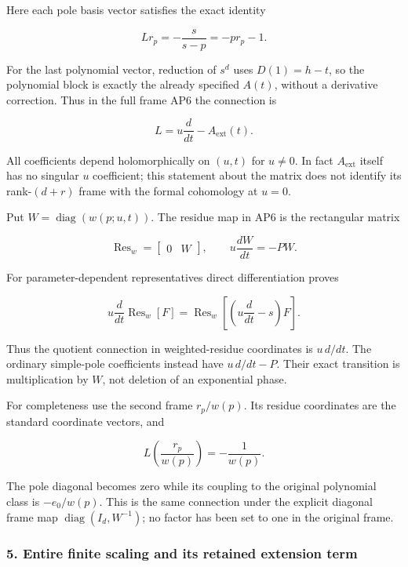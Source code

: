Here each pole basis vector satisfies the exact identity

\[
L r_p=-\frac{s}{s-p}=-p r_p-1.
\tag{AP9}
\]

For the last polynomial vector, reduction of \(s^d\) uses \(D(1)=h-t\), so the polynomial block is exactly the already specified \(A(t)\), without a derivative correction. Thus in the full frame AP6 the connection is

\[
L=u\frac{d}{dt}-A_{\mathrm{ext}}(t).
\tag{AP10}
\]

All coefficients depend holomorphically on \((u,t)\) for \(u\ne0\). In fact \(A_{\mathrm{ext}}\) itself has no singular \(u\) coefficient; this statement about the matrix does not identify its rank-\((d+r)\) frame with the formal cohomology at \(u=0\).

Put \(W=\operatorname{diag}(w(p;u,t))\). The residue map in AP6 is the rectangular matrix

\[
\operatorname{Res}_w=\begin{bmatrix}0&W\end{bmatrix},\qquad
u\frac{dW}{dt}=-P W.
\tag{AP11}
\]

For parameter-dependent representatives direct differentiation proves

\[
u\frac{d}{dt}\operatorname{Res}_w[F]
=\operatorname{Res}_w\left[\left(u\frac{d}{dt}-s\right)F\right].
\tag{AP12}
\]

Thus the quotient connection in weighted-residue coordinates is \(u\,d/dt\). The ordinary simple-pole coefficients instead have \(u\,d/dt-P\). Their exact transition is multiplication by \(W\), not deletion of an exponential phase.

For completeness use the second frame \(r_p/w(p)\). Its residue coordinates are the standard coordinate vectors, and

\[
L\left(\frac{r_p}{w(p)}\right)=-\frac{1}{w(p)}.
\tag{AP13}
\]

The pole diagonal becomes zero while its coupling to the original polynomial class is \(-e_0/w(p)\). This is the same connection under the explicit diagonal frame map \(\operatorname{diag}(I_d,W^{-1})\); no factor has been set to one in the original frame.

\subsubsection{5. Entire finite scaling and its retained extension term}\label{endpoint-analytic_pole--entire-finite-scaling-and-its-retained-extension-term}

